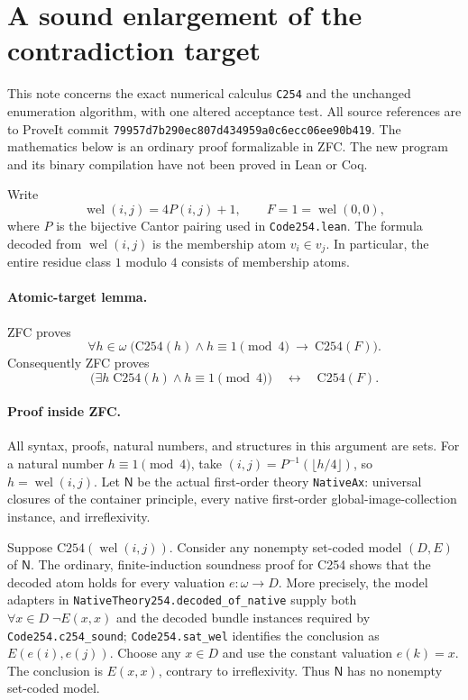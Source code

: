 \section{A sound enlargement of the contradiction target}
\label{sec:atomic-target}

This note concerns the exact numerical calculus \texttt{C254} and the unchanged
enumeration algorithm, with one altered acceptance test.  All source references
are to ProveIt commit
\texttt{79957d7b290ec807d434959a0c6ecc06ee90b419}.
The mathematics below is an ordinary proof formalizable in ZFC.  The new
program and its binary compilation have not been proved in Lean or Coq.

Write
\[
  \operatorname{wel}(i,j)=4P(i,j)+1,\qquad F=1=\operatorname{wel}(0,0),
\]
where $P$ is the bijective Cantor pairing used in \texttt{Code254.lean}.
The formula decoded from $\operatorname{wel}(i,j)$ is the membership atom
$v_i\in v_j$.  In particular, the entire residue class $1$ modulo $4$
consists of membership atoms.

\paragraph{Atomic-target lemma.}
ZFC proves
\[
 \forall h\in\omega\;\bigl(\mathrm{C254}(h)\land h\equiv1\pmod4
                   \ \longrightarrow\ \mathrm{C254}(F)\bigr).
\tag{AT}
\]
Consequently ZFC proves
\[
 \bigl(\exists h\;\mathrm{C254}(h)\land h\equiv1\pmod4\bigr)
       \quad\longleftrightarrow\quad \mathrm{C254}(F).
\]

\paragraph{Proof inside ZFC.}
All syntax, proofs, natural numbers, and structures in this argument are sets.
For a natural number $h\equiv1\pmod4$, take
$(i,j)=P^{-1}(\lfloor h/4\rfloor)$, so $h=\operatorname{wel}(i,j)$.
Let $\mathsf{N}$ be the actual first-order theory \texttt{NativeAx}:
universal closures of the container principle, every native first-order
global-image-collection instance, and irreflexivity.

Suppose $\mathrm{C254}(\operatorname{wel}(i,j))$.  Consider any nonempty
set-coded model $(D,E)$ of $\mathsf{N}$.  The ordinary, finite-induction
soundness proof for C254 shows that the decoded atom holds for every valuation
$e:\omega\to D$.  More precisely, the model adapters in
\texttt{NativeTheory254.decoded\_of\_native} supply both
$\forall x\in D\;\neg E(x,x)$ and the decoded bundle instances required by
\texttt{Code254.c254\_sound}; \texttt{Code254.sat\_wel} identifies the
conclusion as $E(e(i),e(j))$.
Choose any $x\in D$ and use the constant valuation $e(k)=x$.
The conclusion is $E(x,x)$, contrary to irreflexivity.
Thus $\mathsf{N}$ has no nonempty set-coded model.

